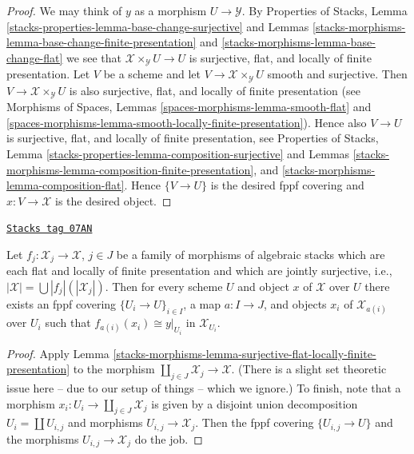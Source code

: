 \begin{proof}
We may think of $y$ as a morphism $U \to \mathcal{Y}$. By
Properties of Stacks, Lemma
\ref{stacks-properties-lemma-base-change-surjective}
and
Lemmas \ref{stacks-morphisms-lemma-base-change-finite-presentation} and
\ref{stacks-morphisms-lemma-base-change-flat}
we see that $\mathcal{X} \times_\mathcal{Y} U \to U$ is surjective, flat,
and locally of finite presentation. Let $V$ be a scheme and let
$V \to \mathcal{X} \times_\mathcal{Y} U$ smooth and surjective.
Then $V \to \mathcal{X} \times_\mathcal{Y} U$ is also surjective, flat, and
locally of finite presentation (see
Morphisms of Spaces, Lemmas
\ref{spaces-morphisms-lemma-smooth-flat} and
\ref{spaces-morphisms-lemma-smooth-locally-finite-presentation}).
Hence also $V \to U$ is surjective, flat, and
locally of finite presentation, see
Properties of Stacks, Lemma
\ref{stacks-properties-lemma-composition-surjective}
and
Lemmas \ref{stacks-morphisms-lemma-composition-finite-presentation}, and
\ref{stacks-morphisms-lemma-composition-flat}.
Hence $\{V \to U\}$ is the desired fppf covering and $x : V \to \mathcal{X}$
is the desired object.
\end{proof}

\begin{lemma}
\label{stacks-morphisms-lemma-surjective-family-flat-locally-finite-presentation}
\href{https://stacks.math.columbia.edu/tag/07AN}{\texttt{Stacks tag 07AN}}

Let $f_j : \mathcal{X}_j \to \mathcal{X}$, $j \in J$ be a family of morphisms
of algebraic stacks which are each flat and locally of finite presentation
and which are jointly surjective, i.e.,
$|\mathcal{X}| = \bigcup |f_j|(|\mathcal{X}_j|)$.
Then for every scheme $U$ and object $x$ of $\mathcal{X}$ over $U$
there exists an fppf covering $\{U_i \to U\}_{i \in I}$, a map
$a : I \to J$, and objects $x_i$ of $\mathcal{X}_{a(i)}$ over $U_i$
such that $f_{a(i)}(x_i) \cong y|_{U_i}$ in $\mathcal{X}_{U_i}$.
\end{lemma}

\begin{proof}
Apply
Lemma \ref{stacks-morphisms-lemma-surjective-flat-locally-finite-presentation}
to the morphism $\coprod_{j \in J} \mathcal{X}_j \to \mathcal{X}$.
(There is a slight set theoretic issue here -- due to our setup of
things -- which we ignore.) To finish, note that a morphism
$x_i : U_i \to \coprod_{j \in J} \mathcal{X}_j$ is given by a
disjoint union decomposition $U_i = \coprod U_{i, j}$ and morphisms
$U_{i, j} \to \mathcal{X}_j$. Then the fppf covering $\{U_{i, j} \to U\}$
and the morphisms $U_{i, j} \to \mathcal{X}_j$ do the job.
\end{proof}

